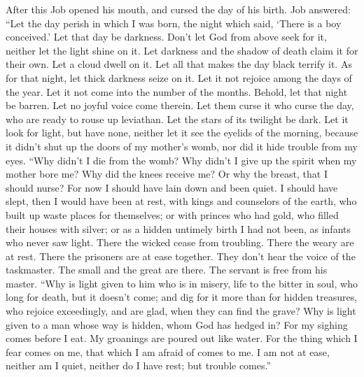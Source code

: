  After this Job opened his mouth, and cursed the day of
his birth.  Job answered:  ``Let the day
perish in which I was born, the night which said, `There is a boy
conceived.'  Let that day be darkness. Don't let God from
above seek for it, neither let the light shine on it.  Let
darkness and the shadow of death claim it for their own. Let a cloud
dwell on it. Let all that makes the day black terrify it. 
As for that night, let thick darkness seize on it. Let it not rejoice
among the days of the year. Let it not come into the number of the
months.  Behold, let that night be barren. Let no joyful
voice come therein.  Let them curse it who curse the day,
who are ready to rouse up leviathan.  Let the stars of its
twilight be dark. Let it look for light, but have none, neither let it
see the eyelids of the morning,  because it didn't shut
up the doors of my mother's womb, nor did it hide trouble from my eyes.
 ``Why didn't I die from the womb? Why didn't I give up
the spirit when my mother bore me?  Why did the knees
receive me? Or why the breast, that I should nurse?  For
now I should have lain down and been quiet. I should have slept, then I
would have been at rest,  with kings and counselors of
the earth, who built up waste places for themselves;  or
with princes who had gold, who filled their houses with silver;
 or as a hidden untimely birth I had not been, as infants
who never saw light.  There the wicked cease from
troubling. There the weary are at rest.  There the
prisoners are at ease together. They don't hear the voice of the
taskmaster.  The small and the great are there. The
servant is free from his master.  ``Why is light given to
him who is in misery, life to the bitter in soul,  who
long for death, but it doesn't come; and dig for it more than for hidden
treasures,  who rejoice exceedingly, and are glad, when
they can find the grave?  Why is light given to a man
whose way is hidden, whom God has hedged in?  For my
sighing comes before I eat. My groanings are poured out like water.
 For the thing which I fear comes on me, that which I am
afraid of comes to me.  I am not at ease, neither am I
quiet, neither do I have rest; but trouble comes.''

